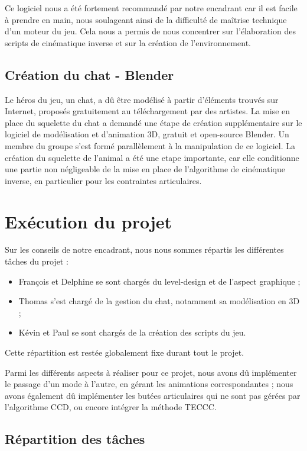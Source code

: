 \documentclass[a4paper,11pt]{article}
\begin{document}
Ce logiciel nous a été fortement recommandé par notre encadrant car il est facile à prendre en main, nous soulageant ainsi de la difficulté de maîtrise technique d'un moteur du jeu. Cela nous a permis de nous concentrer sur l'élaboration des scripts de cinématique inverse et sur la création de l'environnement.

\subsection{Création du chat - Blender}

Le héros du jeu, un chat, a dû être modélisé à partir d'éléments trouvés sur Internet, proposés gratuitement au téléchargement par des artistes. La mise en place du squelette du chat a demandé une étape de création supplémentaire sur le logiciel de modélisation et d'animation 3D, gratuit et open-source Blender. Un membre du groupe s'est formé parallèlement à la manipulation de ce logiciel. La création du squelette de l'animal a été une etape importante, car elle conditionne une partie non négligeable de la mise en place de l'algorithme de cinématique inverse, en particulier pour les contraintes articulaires. 

\section{Exécution du projet}
Sur les conseils de notre encadrant, nous nous sommes répartis les différentes tâches du projet : 
\begin{itemize}
\item François et Delphine se sont chargés du level-design et de l'aspect graphique ;
\item Thomas s'est chargé de la gestion du chat, notamment sa modélisation en 3D ;
\item Kévin et Paul se sont chargés de la création des scripts du jeu.
\end{itemize}
Cette répartition est restée globalement fixe durant tout le projet.

Parmi les différents aspects à réaliser pour ce projet, nous avons dû implémenter le passage d'un mode à l'autre, en gérant les animations correspondantes ; nous avons également dû implémenter les butées articulaires qui ne sont pas gérées par l'algorithme CCD, ou encore intégrer la méthode TECCC. 


\subsection{Répartition des tâches}
\end{document}
